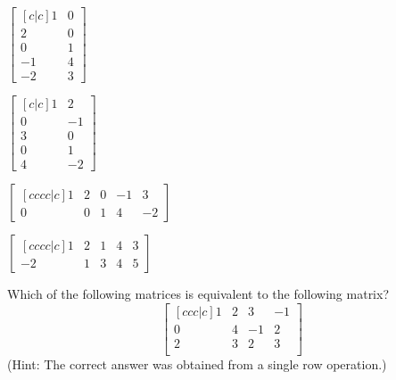 \documentclass{article}
\begin{document}
\begin{readinessAssuranceTest}
\begin{multicols}{3}
\begin{readinessAssuranceTestChoices}
\item \(
      \begin{bmatrix}[c|c]
        1 & 0 \\
        2 & 0 \\
        0 & 1 \\
        -1 & 4 \\
        -2 & 3
      \end{bmatrix}
    \)
\item \(
      \begin{bmatrix}[c|c]
        1 & 2 \\
        0 & -1 \\
        3 & 0 \\
        0 & 1 \\
        4 & -2
      \end{bmatrix}
    \)
\item \(
      \begin{bmatrix}[cccc|c]
        1 & 2 & 0 & -1 & 3 \\
        0 & 0 & 1 & 4 & -2
      \end{bmatrix}
    \) %
\item \(
      \begin{bmatrix}[cccc|c]
        1 & 2 & 1 & 4 & 3 \\
        -2 & 1 & 3 & 4 & 5
      \end{bmatrix}
    \)
\end{readinessAssuranceTestChoices}
\end{multicols}

\item Which of the following matrices is equivalent to the following matrix?
  \[
    \begin{bmatrix}[ccc|c]
      1 & 2 & 3 & -1 \\
      0 & 4 & -1 & 2 \\
      2 & 3 & 2 & 3 \\
    \end{bmatrix}
  \]
  (Hint: The correct answer was obtained from a single row operation.)


\end{readinessAssuranceTest}
\end{document}
